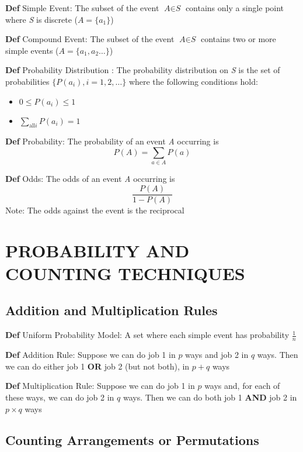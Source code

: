 \documentclass[11pt,notitlepage]{report}
\begin{document}
\textbf{Def} Simple Event: The subset of the event $\textit{A} \in \textit{S}$ contains only a single point where \textit{S} is discrete ($\textit{A} = \{a_1\}$)

\textbf{Def} Compound Event: The subset of the event $\textit{A} \in \textit{S}$ contains two or more simple events ($\textit{A} = \{a_1, a_2 \dots\}$)

\textbf{Def} Probability Distribution : The probability distribution on \textit{S} is the set of probabilities $\{P(a_i), i = 1, 2, \dots\}$ where the following conditions hold:
\begin{itemize}
    \item $0 \leq P(a_i) \leq 1$
    \item $\sum_{\text{all} i} P(a_i) = 1$
\end{itemize}


\textbf{Def} Probability: The probability of an event \textit{A} occurring is
$$P(A) = \sum_{a \in A}P(a)$$


\textbf{Def} Odds: The odds of an event \textit{A} occurring is
$$\frac{P(A)}{1-P(A)}$$
\hspace*{5mm} Note: The odds against the event is the reciprocal

\newpage


\chapter{PROBABILITY AND COUNTING TECHNIQUES}

\section{Addition and Multiplication Rules}


\textbf{Def} Uniform Probability Model: A set where each simple event has probability $\frac{1}{n}$

\textbf{Def} Addition Rule: Suppose we can do job 1 in $p$ ways and job 2 in $q$ ways. Then we can do
either job 1 \textbf{OR} job 2 (but not both), in $p + q$ ways

\textbf{Def} Multiplication Rule: Suppose we can do job 1 in $p$ ways and, for each of these ways, we
can do job 2 in $q$ ways. Then we can do both job 1 \textbf{AND} job 2 in $p \times q$ ways


\section{Counting Arrangements or Permutations}
\end{document}
